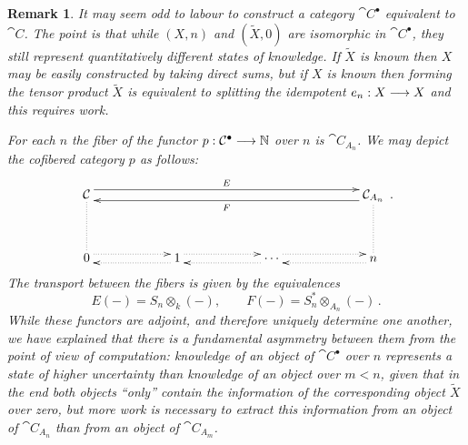 \documentclass[english,letter paper,12pt,leqno]{article}
\theoremstyle{example}
\newtheorem{remark}[theorem]{Remark}
\numberwithin{equation}{section}
\begin{document}
\begin{remark}\label{remark:tensor_and_idempotent} It may seem odd to labour to construct a category $\cat{C}^\bullet$ equivalent to $\cat{C}$. The point is that while $(X,n)$ and $(\widetilde{X}, 0)$ are isomorphic in $\cat{C}^\bullet$, they still represent quantitatively different states of knowledge. If $\widetilde{X}$ is known then $X$ may be easily constructed by taking direct sums, but if $X$ is known then forming the tensor product $\widetilde{X}$ is equivalent to splitting the idempotent $e_n: X \longrightarrow X$ and this requires work.

For each $n$ the fiber of the functor $p: \mathcal{C}^\bullet \longrightarrow \mathbb{N}$ over $n$ is $\cat{C}_{A_n}$. We may depict the cofibered category $p$ as follows:
\begin{equation}\label{eq:cofibered_diagram}
\xymatrix@C+3pc@R+1pc{
\cat{C} \ar@{.}[d] \ar@<1ex>[rrr]^-{E} & & & \cat{C}_{A_n} \ar@{.}[d] \ar@<1ex>[lll]^-{F}\\
0 \ar@{.>}@<0.8ex>[r] & 1 \ar@{.>}@<0.8ex>[r]\ar@{.>}@<0.8ex>[l] & \cdots \ar@{.>}@<0.8ex>[l]\ar@{.>}@<0.8ex>[r] & n \ar@{.>}@<0.8ex>[l]
}\,.
\end{equation}
The transport between the fibers is given by the equivalences
\[
E(-) = S_{n} \otimes_k (-), \qquad F(-) = S^*_{n} \otimes_{A_n} (-)\,.
\]
While these functors are adjoint, and therefore uniquely determine one another, we have explained that there is a fundamental asymmetry between them from the point of view of computation: knowledge of an object of $\cat{C}^\bullet$ over $n$ represents a state of higher uncertainty than knowledge of an object over $m < n$, given that in the end both objects ``only'' contain the information of the corresponding object $\widetilde{X}$ over zero, but more work is necessary to extract this information from an object of $\cat{C}_{A_n}$ than from an object of $\cat{C}_{A_m}$.
\end{remark}
\end{document}
